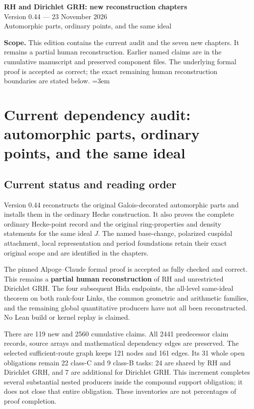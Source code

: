 \documentclass[11pt,a4paper]{article}
\numberwithin{equation}{section}
\theoremstyle{remark}\newtheorem{remark}[theorem]{Remark}
\begin{document}
\begin{center}
{\LARGE\bfseries RH and Dirichlet GRH: new reconstruction chapters}\\[7pt]
{\large Version 0.44 --- 23 November 2026}\\[5pt]
{\large Automorphic parts, ordinary points, and the same ideal}
\end{center}
\textbf{Scope.} This edition contains the current audit and the seven new
chapters. It remains a partial human reconstruction. Earlier named
claims are in the cumulative manuscript and preserved component files.
The underlying formal proof is accepted as correct; the exact remaining
human reconstruction boundaries are stated below.
\setcounter{tocdepth}{1}
\tableofcontents
\clearpage
\begingroup\emergencystretch=3em
\section{Current dependency audit: automorphic parts, ordinary points, and the same ideal}
\label{sec:dependency-audit-v44}

\subsection{Current status and reading order}

Version 0.44 reconstructs the original Galois-decorated automorphic
parts and installs them in the ordinary Hecke construction.  It also
proves the complete ordinary Hecke-point record and the original
ring-properties and density statements for the same ideal $J$.
The named base-change, polarized cuspidal attachment, local
representation and period foundations retain their exact original
scope and are identified in the chapters.

The pinned Alpoge--Claude formal proof is accepted as fully checked
and correct.  This remains a \textbf{partial human reconstruction}
of RH and unrestricted Dirichlet GRH.  The four subsequent Hida
endpoints, the all-level same-ideal theorem on both rank-four Links,
the common geometric and arithmetic families, and the remaining
global quantitative producers have not all been reconstructed.
No Lean build or kernel replay is claimed.

There are 119 new and 2560 cumulative claims.  All 2441
predecessor claim records, source arrays and mathematical dependency
edges are preserved.  The selected sufficient-route graph keeps
121 nodes and 161 edges.  Its 31 whole open obligations remain
22 class-C and 9 class-B tasks: 24 are shared by RH and Dirichlet
GRH, and 7 are additional for Dirichlet GRH.  This increment
completes several substantial nested producers inside the compound
support obligation; it does not close that entire obligation.
These inventories are not percentages of proof completion.
\end{document}
